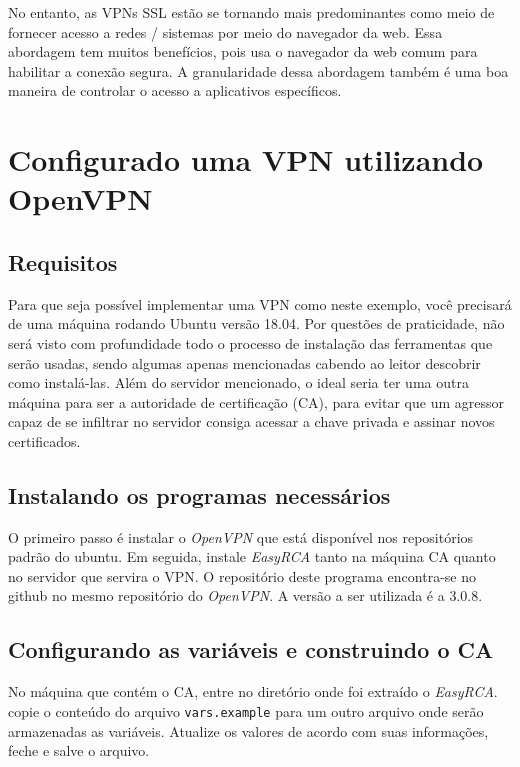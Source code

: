 \documentclass[12pt]{article}
\begin{document}
\begin{flushleft}
No entanto, as VPNs SSL estão se tornando mais predominantes como meio de fornecer acesso a redes / sistemas por meio do navegador da web. Essa abordagem tem muitos benefícios, pois usa o navegador da web comum para habilitar a conexão segura. A granularidade dessa abordagem também é uma boa maneira de controlar o acesso a aplicativos específicos.


\section{Configurado uma VPN utilizando OpenVPN}


\subsection{Requisitos}

Para que seja possível implementar uma VPN como neste exemplo, você precisará
de uma máquina rodando Ubuntu versão 18.04. Por questões de praticidade, não será
visto com profundidade todo o processo de instalação das ferramentas que serão usadas, sendo algumas 
apenas mencionadas cabendo ao leitor descobrir como instalá-las. Além do servidor mencionado,
o ideal seria ter uma outra máquina para ser a autoridade de certificação (CA), para evitar
que um agressor capaz de se infiltrar no servidor consiga acessar a chave privada
e assinar novos certificados. 

\subsection{Instalando os programas necessários}

O primeiro passo é instalar o \emph{OpenVPN} que está disponível nos repositórios padrão do ubuntu.
Em seguida, instale \emph{EasyRCA} tanto na máquina CA quanto no servidor que servira o VPN.
O repositório deste programa encontra-se no github no mesmo repositório do \emph{OpenVPN}. 
A versão a ser utilizada é a 3.0.8.

\subsection{Configurando as variáveis e construindo o CA}

No máquina que contém o CA, entre no diretório onde foi extraído o \emph{EasyRCA}. copie o conteúdo
do arquivo \texttt{vars.example} para um outro arquivo onde serão armazenadas as variáveis. Atualize
os valores de acordo com suas informações, feche e salve o arquivo. 


\end{flushleft}
\end{document}
